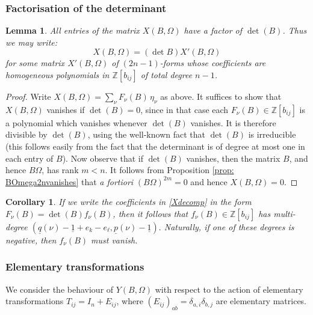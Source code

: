\documentclass[10pt]{amsart}
\newcommand{\ZZ}{{\mathbb Z}}
\newcommand{\pp}{{\underline{p}}}
\newcommand{\qq}{{\underline{q}}}
\newcommand{\one}{{\underline{1}}}
\theoremstyle{plain}
\newtheorem{lem}[thm]{Lemma}
\newtheorem{cor}[thm]{Corollary}
\newcommand{\0}{\color{blue}{\mathsf{0}}}
\begin{document}
\subsubsection{Factorisation of the determinant}
\begin{lem}\label{detBlem}
All entries of the matrix $X(B,\Omega)$ have a factor of $\det(B)$. Thus we may write: 
\begin{equation}\label{detB}
X(B,\Omega)=(\det B) X'(B,\Omega)
\end{equation}
for some  matrix $X'(B,\Omega)$ of  $(2n-1)$-forms whose  coefficients are homogeneous polynomials in   $\ZZ[b_{ij}]$ of total degree $n-1$.
\end{lem}
\begin{proof}   
Write $X(B,\Omega)= \sum_{\nu} F_{\nu}(B)\, \eta_{\nu}$ as above.  It suffices to show that 
$X(B,\Omega)$ vanishes if $\det(B)=0$, since in that case each $F_{\nu}(B) \in \ZZ[b_{ij}]$ is a polynomial which vanishes whenever $\det(B)$ vanishes.   It is therefore divisible by $\det(B)$,  using the well-known fact that $\det(B)$ is  irreducible (this follows easily from the fact that the determinant is of degree at most one in each  entry of $B$).  
 Now observe that if $\det(B)$ vanishes, then the matrix $B$, and hence $B\Omega$,  has  rank $m<n$. 
 It follows from Proposition \ref{prop: BOmega2nvanishes} that \emph{a fortiori} $(B\Omega)^{2m}=0$ and hence $X(B, \Omega)=0$.
 \end{proof}

\begin{cor} \label{cor: weightsfB}
If we write the coefficients in \eqref{Xdecomp}  in the form $F_{\nu}(B) = \det(B) f_{\nu}(B)$, then it follows that  $f_{\nu}(B) \in \ZZ[b_{ij}]$ has multi-degree $(\qq(\nu)- \one + e_k-e_{\ell}, \pp(\nu)-\one).$
Naturally, if one of these degrees is negative, then $f_{\nu}(B)$ must vanish.
\end{cor}

\subsubsection{Elementary transformations}
We consider the  behaviour of $Y(B,\Omega)$ with respect to the action  of elementary transformations $T_{ij}=I_n+E_{ij}$,
where  $(E_{ij})_{ab}=\delta_{a,i}\delta_{b,j}$ are  elementary matrices.
\end{document}
